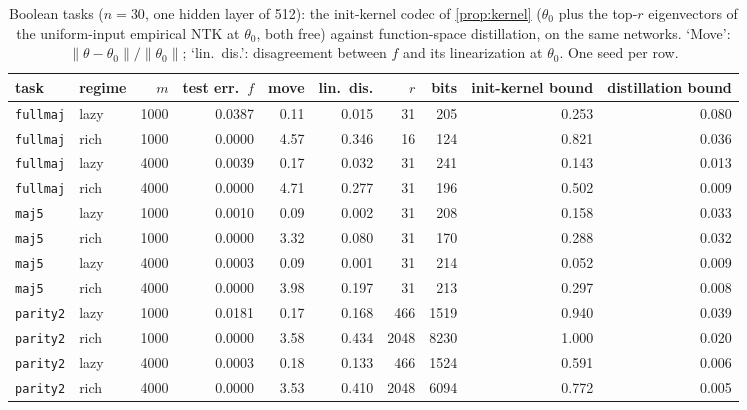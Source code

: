 \begin{table}[t]
\centering\small
\begin{adjustbox}{max width=\linewidth}\begin{tabular}{l l r r r r r r r r}
\toprule
task & regime & $m$ & test err.\ $f$ & move & lin.\ dis. & $r$ & bits & init-kernel bound & distillation bound \\
\midrule
\texttt{fullmaj} & lazy & 1000 & 0.0387 & 0.11 & 0.015 & 31 & 205 & 0.253 & 0.080 \\
\texttt{fullmaj} & rich & 1000 & 0.0000 & 4.57 & 0.346 & 16 & 124 & 0.821 & 0.036 \\
\texttt{fullmaj} & lazy & 4000 & 0.0039 & 0.17 & 0.032 & 31 & 241 & 0.143 & 0.013 \\
\texttt{fullmaj} & rich & 4000 & 0.0000 & 4.71 & 0.277 & 31 & 196 & 0.502 & 0.009 \\
\texttt{maj5} & lazy & 1000 & 0.0010 & 0.09 & 0.002 & 31 & 208 & 0.158 & 0.033 \\
\texttt{maj5} & rich & 1000 & 0.0000 & 3.32 & 0.080 & 31 & 170 & 0.288 & 0.032 \\
\texttt{maj5} & lazy & 4000 & 0.0003 & 0.09 & 0.001 & 31 & 214 & 0.052 & 0.009 \\
\texttt{maj5} & rich & 4000 & 0.0000 & 3.98 & 0.197 & 31 & 213 & 0.297 & 0.008 \\
\texttt{parity2} & lazy & 1000 & 0.0181 & 0.17 & 0.168 & 466 & 1519 & 0.940 & 0.039 \\
\texttt{parity2} & rich & 1000 & 0.0000 & 3.58 & 0.434 & 2048 & 8230 & 1.000 & 0.020 \\
\texttt{parity2} & lazy & 4000 & 0.0003 & 0.18 & 0.133 & 466 & 1524 & 0.591 & 0.006 \\
\texttt{parity2} & rich & 4000 & 0.0000 & 3.53 & 0.410 & 2048 & 6094 & 0.772 & 0.005 \\
\bottomrule
\end{tabular}\end{adjustbox}
\caption{Boolean tasks ($n=30$, one hidden layer of 512): the init-kernel codec of \cref{prop:kernel} ($\theta_0$ plus the top-$r$ eigenvectors of the uniform-input empirical NTK at $\theta_0$, both free) against function-space distillation, on the same networks. `Move': $\|\theta-\theta_0\|/\|\theta_0\|$; `lin.\ dis.': disagreement between $f$ and its linearization at $\theta_0$. One seed per row.}\label{tab:kernel}
\end{table}
